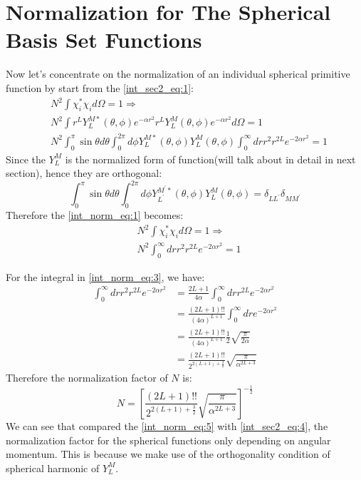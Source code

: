 \section{Normalization for The Spherical Basis Set Functions}
%
%
%
Now let's concentrate on the normalization of an individual spherical primitive function
by start from the \ref{int_sec2_eq:1}:
\begin{equation}
 \begin{split}
  &N^{2}\int \chi_{i}^{*}\chi_{i} d\Omega = 1 \Longrightarrow  \\
  &N^{2}\int r^{L}Y_{L}^{M*}(\theta,\phi)e^{-\alpha r^{2}} 
r^{L}Y_{L}^{M}(\theta,\phi)e^{-\alpha r^{2}} d\Omega = 1  \\
&N^{2}\int_{0}^{\pi}\sin \theta d\theta \int_{0}^{2\pi}d\phi Y_{L}^{M*}(\theta,\phi)
Y_{L}^{M}(\theta,\phi) \int_{0}^{\infty} dr r^{2}r^{2L}e^{-2\alpha r^{2}} = 1
 \end{split}
\label{int_norm_eq:1}
\end{equation}
Since the $Y_{L}^{M}$ is the normalized form of function(will talk about in detail in
next section), hence they are orthogonal:
\begin{equation}
 \label{int_norm_eq:2}
\int_{0}^{\pi}\sin \theta d\theta \int_{0}^{2\pi}d\phi Y_{L^{'}}^{M^{'}*}(\theta,\phi)
Y_{L}^{M}(\theta,\phi) = \delta_{LL^{'}}\delta_{MM^{'}}
\end{equation}
Therefore the \ref{int_norm_eq:1} becomes:
\begin{equation}
 \begin{split}
  &N^{2}\int \chi_{i}^{*}\chi_{i} d\Omega = 1 \Longrightarrow  \\
  &N^{2}\int_{0}^{\infty} dr r^{2}r^{2L}e^{-2\alpha r^{2}} = 1
 \end{split}
\label{int_norm_eq:3}
\end{equation}

For the integral in \ref{int_norm_eq:3}, we have:
\begin{equation}
 \begin{split}
 \int_{0}^{\infty} dr r^{2}r^{2L}e^{-2\alpha r^{2}} &= 
\frac{2L+1}{4\alpha}\int_{0}^{\infty} dr r^{2L}e^{-2\alpha r^{2}}  \\
&=\frac{(2L+1)!!}{(4\alpha)^{L+1}}\int_{0}^{\infty} dr e^{-2\alpha r^{2}} \\
&=\frac{(2L+1)!!}{(4\alpha)^{L+1}}\frac{1}{2}\sqrt{\frac{\pi}{2\alpha}} \\
&=\frac{(2L+1)!!}{2^{2(L+1)+\frac{3}{2}}}\sqrt{\frac{\pi}{\alpha^{2L+3}}}
 \end{split}
\label{int_norm_eq:4}
\end{equation}
Therefore the normalization factor of $N$ is:
\begin{equation}
\label{int_norm_eq:5}
 N = \left[ \frac{(2L+1)!!}{2^{2(L+1)+\frac{3}{2}}}
            \sqrt{\frac{\pi}{\alpha^{2L+3}}}\right]^{-\frac{1}{2}}
\end{equation}
We can see that compared the \ref{int_norm_eq:5} with \ref{int_sec2_eq:4}, the normalization factor
for the spherical functions only depending on angular momentum. This is because we make use of 
the orthogonality condition of spherical harmonic of $Y_{L}^{M}$.

